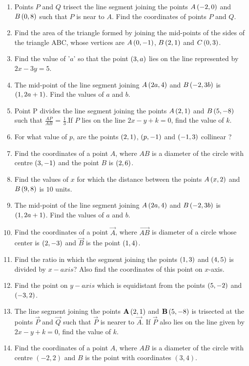 \begin{enumerate}
\item Points $P$ and $Q$ trisect the line segment joining the points $A\left(-2, 0\right)$ and $B\left(0, 8\right)$ such that $P$ is near to $A$. Find the coordinates of points $P$ and $Q$.

\item Find the area of the triangle formed by joining the mid-points of the sides of the triangle ABC, whose vertices are $A\left(0, - 1\right)$, $B\left(2, 1\right)$ and $C\left(0, 3\right)$.


\item Find the value of '$a$' so that the point $\left(3, a\right)$ lies on the line represented
by $2 x - 3 y = 5$.

\item The mid-point of the line segment joining $A\left(2a, 4\right)$ and $B\left(-2, 3b\right)$ is $\left(1, 2a + 1\right)$. Find the values of $a$ and $b$.

\item Point P divides the line segment joining the points $A\left(2, 1\right)$ and $B\left(5, -8\right)$ such that $\frac{AP}{AB}$ = $\frac{1}{3}$.If $P$ lies on the line $2x - y + k = 0$, find the value of $k$.

\item For what value of $p$, are the points $\left(2, 1\right)$, $\left(p,- 1\right)$ and $\left(- 1, 3\right)$ collinear ?

\item Find the coordinates of a point $A$, where $AB$ is a diameter of the circle with centre $\left(3, -1\right)$ and the point $B$ is $\left(2, 6\right)$.

\item Find the values of $x$ for which the distance between the points $A\left(x, 2\right)$ and $B\left(9, 8\right)$ is $10$ units.

\item The mid-point of the line segment joining $A\left(2a, 4\right)$ and $B\left(-2, 3b\right)$ is $\left(1, 2a + 1\right)$. Find the values of $a$ and $b$.


\item Find the coordinates of a point $\vec{A}$, where $\vec{AB}$ is diameter of a circle whose center is $\left(2,-3\right)$ and $\vec{B}$ is the point $\left(1,4\right)$.
\item Find the ratio in which the segment joining the points $\left(1, 3\right)$ and $\left(4, 5\right)$ is divided by $x-axis$? Also find the coordinates of this point on  $x$-axis.
\item Find the point on $y-axis$ which is equidistant from the points $\left(5, -2\right)$ and $\left(-3, 2\right)$.    
\item The line segment joining the points $\mathbf{A}\left(2, 1\right)$ and $\mathbf{B}\left(5, -8\right)$ is trisected at the points $\vec{P}$ and $\vec{Q}$ such that $\vec{P}$ is nearer to $\vec{A}$. If $\vec{P}$ also lies on the line given by $2x-y+k=0$, find the value of $k$.
\item Find the coordinates of a point $A$, where $AB$ is a diameter of the circle with centre $(-2, 2)$ and $B$ is the point with coordinates $(3, 4)$.
\end{enumerate}
